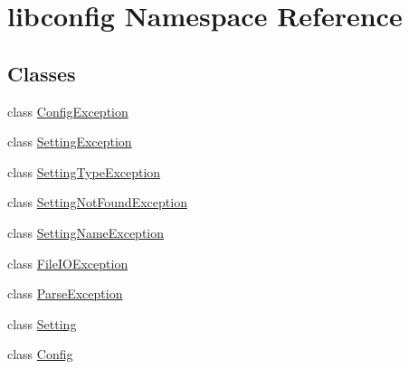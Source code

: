 \hypertarget{namespacelibconfig}{
\section{libconfig Namespace Reference}
\label{namespacelibconfig}
}
\subsection*{Classes}
\begin{DoxyCompactItemize}
\item 
class \hyperlink{classlibconfig_1_1_config_exception}{ConfigException}
\item 
class \hyperlink{classlibconfig_1_1_setting_exception}{SettingException}
\item 
class \hyperlink{classlibconfig_1_1_setting_type_exception}{SettingTypeException}
\item 
class \hyperlink{classlibconfig_1_1_setting_not_found_exception}{SettingNotFoundException}
\item 
class \hyperlink{classlibconfig_1_1_setting_name_exception}{SettingNameException}
\item 
class \hyperlink{classlibconfig_1_1_file_i_o_exception}{FileIOException}
\item 
class \hyperlink{classlibconfig_1_1_parse_exception}{ParseException}
\item 
class \hyperlink{classlibconfig_1_1_setting}{Setting}
\item 
class \hyperlink{classlibconfig_1_1_config}{Config}
\end{DoxyCompactItemize}
